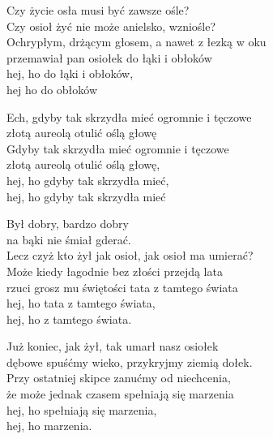 \begin{text}
    Czy życie osła musi być zawsze ośle?\\
    Czy osioł żyć nie może anielsko, wzniośle?\\
    Ochrypłym, drżącym głosem, a nawet z łezką w oku\\
    przemawiał pan osiołek do łąki i obłoków\\
    hej, ho do łąki i obłoków,\\
    hej ho do obłoków

    Ech, gdyby tak skrzydła mieć ogromnie i tęczowe\\
    złotą aureolą otulić oślą głowę\\
    Gdyby tak skrzydła mieć ogromnie i tęczowe\\
    złotą aureolą otulić oślą głowę,\\
    hej, ho gdyby tak skrzydła mieć,\\
    hej, ho gdyby tak skrzydła mieć

    Był dobry, bardzo dobry\\
    na bąki nie śmiał gderać.\\
    Lecz czyż kto żył jak osioł, jak osioł ma umierać?\\
    Może kiedy łagodnie bez złości przejdą lata\\
    rzuci grosz mu świętości tata z tamtego świata\\
    hej, ho tata z tamtego świata,\\
    hej, ho z tamtego świata.

    Już koniec, jak żył, tak umarł nasz osiołek\\
    dębowe spuśćmy wieko, przykryjmy ziemią dołek.\\
    Przy ostatniej skipce zanućmy od niechcenia,\\
    że może jednak czasem spełniają się marzenia\\
    hej, ho spełniają się marzenia,\\
    hej, ho marzenia.
\end{text}
\begin{chord}

\end{chord}